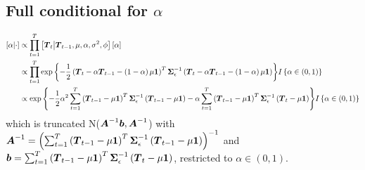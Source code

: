 \documentclass{article}\usepackage[]{graphicx}\usepackage[]{color}
\def\bm#1{\mbox{\boldmath $#1$}}
\begin{document}
\subsection{Full conditional for $\alpha$}
%
\begin{align*}
%
\left[ \alpha \middle| \cdot \right] & \propto \prod_{t = 1}^T \left[ \bm{T}_t \middle| \bm{T}_{t - 1}, \mu, \alpha, \sigma^2, \phi \right] \left[ \alpha \right]\\
%
& \propto \prod_{t = 1}^T \exp{ \left\{ - \frac{1} {2} \left( \bm{T}_t  - \alpha \bm{T}_{t - 1} - \left( 1 - \alpha \right) \mu \bm{1} \right)^T \bm{\Sigma}_\epsilon^{ - 1} \left( \bm{T}_t  - \alpha \bm{T}_{t - 1} - \left( 1 - \alpha \right) \mu \bm{1} \right) \right\} } I \left\{ \alpha \in \left( 0, 1 \right) \right\}\\
%
& \propto \exp{ \left\{ - \frac{1} {2} \alpha^2 \sum_{t = 1}^T \left( \bm{T}_{t - 1} - \mu \bm{1} \right)^T \bm{\Sigma}_\epsilon^{ - 1} \left( \bm{T}_{t - 1} - \mu \bm{1} \right) - \alpha \sum_{t = 1}^T \left( \bm{T}_{t - 1} - \mu \bm{1} \right)^T \bm{\Sigma}_\epsilon^{ - 1} \left( \bm{T}_t - \mu \bm{1} \right) \right\} } I \left\{ \alpha \in \left( 0, 1 \right) \right\}\\
%
\end{align*}
%
which is truncated N($\bm{A}^{ - 1}\bm{b}, \bm{A}^{ - 1}$) with $\bm{A}^{ - 1} = \left(\sum_{t = 1}^T \left( \bm{T}_{t - 1} - \mu \bm{1} \right)^T \bm{\Sigma}_\epsilon^{ - 1} \left( \bm{T}_{t - 1} - \mu \bm{1} \right) \right)^{ - 1}$ and $\bm{b} = \sum_{t = 1}^T \left( \bm{T}_{t - 1} - \mu \bm{1} \right)^T \bm{\Sigma}_\epsilon^{ - 1} \left( \bm{T}_t - \mu \bm{1} \right)$, restricted to $\alpha \in \left( 0, 1 \right)$.
%
%
\end{document}
